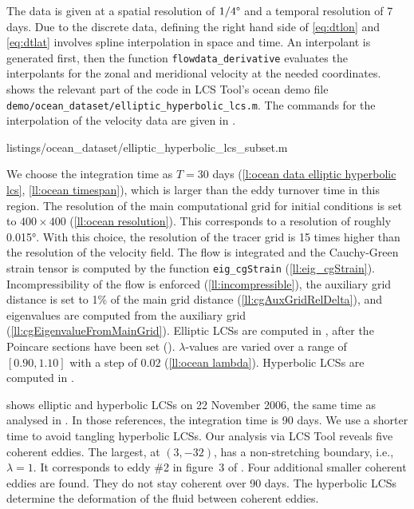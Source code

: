 \documentclass{article}
\begin{document}
The data is given at a spatial resolution of $1/4\degree$ and a temporal resolution of 7 days.
Due to the discrete data, defining the right hand side of \cref{eq:dtlon} and \cref{eq:dtlat} involves spline interpolation in space and time.
An interpolant is generated first, then the function \lstinline!flowdata_derivative! evaluates the interpolants for the zonal and meridional velocity at the needed coordinates.
 shows the relevant part of the code in LCS Tool's ocean demo file \lstinline!demo/ocean_dataset/elliptic_hyperbolic_lcs.m!.
The commands for the interpolation of the velocity data are given in .


        {listings/ocean_dataset/elliptic_hyperbolic_lcs_subset.m}

We choose the integration time as $T=30$ days (\cref{l:ocean data elliptic hyperbolic lcs}, \cref{ll:ocean timespan}), which is larger than the eddy turnover time in this region.
The resolution of the main computational grid for initial conditions is set to $400 \times 400$ (\cref{ll:ocean resolution}).
This corresponds to a resolution of roughly 0.015°.
With this choice, the resolution of the tracer grid is 15 times higher than the resolution of the velocity field.
The flow is integrated and the Cauchy-Green strain tensor is computed by the function \lstinline!eig_cgStrain! (\cref{ll:eig_cgStrain}).
Incompressibility of the flow is enforced (\cref{ll:incompressible}), the auxiliary grid distance is set to 1\% of the main grid distance (\cref{ll:cgAuxGridRelDelta}), and eigenvalues are computed from the auxiliary grid (\cref{ll:cgEigenvalueFromMainGrid}).
Elliptic LCSs are computed in , after the Poincare sections have been set ().
$\lambda$-values are varied over a range of $[0.90,1.10]$ with a step of $0.02$ (\cref{ll:ocean lambda}).
Hyperbolic LCSs are computed in .

 shows elliptic and hyperbolic LCSs on 22 November 2006, the same time as analysed in \textcite{haller13:_coher_lagran,haller14:_adden_coher_lagran,beron-vera13:_objec_agulh}.
In those references, the integration time is 90 days.
We use a shorter time to avoid tangling hyperbolic LCSs.
Our analysis via LCS Tool reveals five coherent eddies.
The largest, at $(3,-32)$, has a non-stretching boundary, i.e., $\lambda = 1$.
It corresponds to eddy \#2 in figure~3 of \textcite{beron-vera13:_objec_agulh}.
Four additional smaller coherent eddies are found.
They do not stay coherent over 90 days.
The hyperbolic LCSs determine the deformation of the fluid between coherent eddies.
\end{document}
